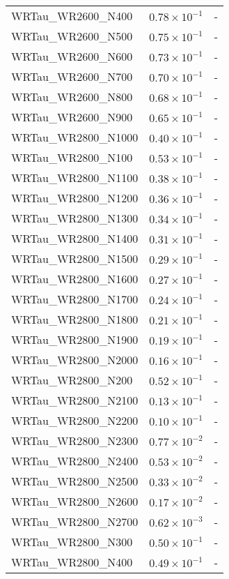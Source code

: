 \begin{longtable}[c]{| C{.35\textwidth} | C{.15\textwidth} | C{.1\textwidth}|}
    WRTau\_WR2600\_N400 & $0.78\times10^{-1}$ & - \\
    WRTau\_WR2600\_N500 & $0.75\times10^{-1}$ & - \\
    WRTau\_WR2600\_N600 & $0.73\times10^{-1}$ & - \\
    WRTau\_WR2600\_N700 & $0.70\times10^{-1}$ & - \\
    WRTau\_WR2600\_N800 & $0.68\times10^{-1}$ & - \\
    WRTau\_WR2600\_N900 & $0.65\times10^{-1}$ & - \\ \hline
    WRTau\_WR2800\_N1000 & $0.40\times10^{-1}$ & - \\
    WRTau\_WR2800\_N100 & $0.53\times10^{-1}$ & - \\
    WRTau\_WR2800\_N1100 & $0.38\times10^{-1}$ & - \\
    WRTau\_WR2800\_N1200 & $0.36\times10^{-1}$ & - \\
    WRTau\_WR2800\_N1300 & $0.34\times10^{-1}$ & - \\
    WRTau\_WR2800\_N1400 & $0.31\times10^{-1}$ & - \\
    WRTau\_WR2800\_N1500 & $0.29\times10^{-1}$ & - \\
    WRTau\_WR2800\_N1600 & $0.27\times10^{-1}$ & - \\
    WRTau\_WR2800\_N1700 & $0.24\times10^{-1}$ & - \\
    WRTau\_WR2800\_N1800 & $0.21\times10^{-1}$ & - \\
    WRTau\_WR2800\_N1900 & $0.19\times10^{-1}$ & - \\
    WRTau\_WR2800\_N2000 & $0.16\times10^{-1}$ & - \\
    WRTau\_WR2800\_N200 & $0.52\times10^{-1}$ & - \\
    WRTau\_WR2800\_N2100 & $0.13\times10^{-1}$ & - \\
    WRTau\_WR2800\_N2200 & $0.10\times10^{-1}$ & - \\
    WRTau\_WR2800\_N2300 & $0.77\times10^{-2}$ & - \\
    WRTau\_WR2800\_N2400 & $0.53\times10^{-2}$ & - \\
    WRTau\_WR2800\_N2500 & $0.33\times10^{-2}$ & - \\
    WRTau\_WR2800\_N2600 & $0.17\times10^{-2}$ & - \\
    WRTau\_WR2800\_N2700 & $0.62\times10^{-3}$ & - \\
    WRTau\_WR2800\_N300 & $0.50\times10^{-1}$ & - \\
    WRTau\_WR2800\_N400 & $0.49\times10^{-1}$ & - \\

\end{longtable}
